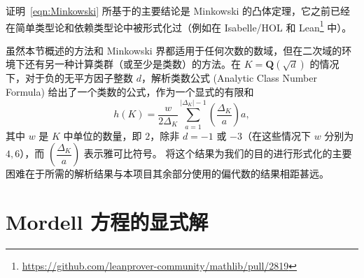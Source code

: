 \documentclass[sigplan,10pt,nonacm,
screen]{acmart} \settopmatter{printfolios=true,printccs=false,printacmref=false}
\newcommand{\sd}[1]{\todo[color=yellow]{SD: #1}}
\newcommand{\QQ}{\mathbf{Q}}
\newcommand{\ZZ}{\mathbf{Z}}
\DeclareMathOperator{\Cl}{Cl}
\DeclareMathOperator{\SL}{SL}
\DeclareMathOperator{\PSL}{PSL}
\begin{document}
证明~\eqref{eqn:Minkowski} 所基于的主要结论是 Minkowski 的凸体定理，它之前已经在简单类型论和依赖类型论中被形式化过（例如在 Isabelle/HOL \cite{Minkowskis_Theorem-AFP} 和 Lean\footnote{\url{https://github.com/leanprover-community/mathlib/pull/2819}} 中）。

虽然本节概述的方法和 Minkowski 界都适用于任何次数的数域，但在二次域的环境下还有另一种计算类群（或至少是类数）的方法。在 $K=\QQ(\sqrt{d})$ 的情况下，对于负的无平方因子整数 $d$，解析类数公式 (Analytic Class Number Formula) \cite[第 VII.5 节]{Neukirch} 给出了一个类数的公式，作为一个显式的有限和
\begin{equation*}
h(K) = \dfrac{w}{2\Delta_K} \sum_{a=1}^{|\Delta_K|-1} \left(\dfrac{\Delta_K}{a}\right) a,
\end{equation*}
其中 $w$ 是 $K$ 中单位的数量，即 $2$，除非 $d=-1$ 或 $-3$（在这些情况下 $w$ 分别为 $4,6$），而 $\left(\dfrac{\Delta_K}{a}\right)$ 表示雅可比符号。
将这个结果为我们的目的进行形式化的主要困难在于所需的解析结果与本项目其余部分使用的偏代数的结果相距甚远。

%

\section{Mordell 方程的显式解}\label{sec:Mordell}
\end{document}
